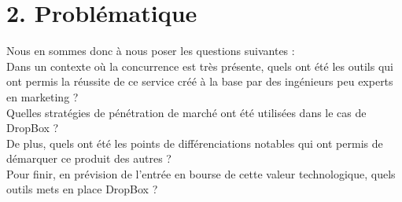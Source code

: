 \documentclass[a4paper, 10pt]{article}
\begin{document}
\newpage
\section*{2. Probl\'ematique}
Nous en sommes donc à nous poser les questions suivantes :\\
Dans un contexte où la concurrence est très présente, quels ont été les outils qui ont permis la réussite de ce service
créé à la base par des ingénieurs peu experts en marketing ?\\
Quelles stratégies de pénétration de marché ont été utilisées dans le cas de DropBox ?\\
De plus, quels ont été les points de différenciations notables qui ont permis de démarquer ce produit des autres ?\\
Pour finir, en prévision de l'entrée en bourse de cette valeur technologique,
quels outils mets en place DropBox ? \\ \\ \\
\end{document}
